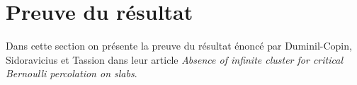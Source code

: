 \chapter{Preuve du résultat}
	Dans cette section on présente la preuve du résultat énoncé par Duminil-Copin, Sidoravicius et Tassion dans leur article \emph{Absence of infinite cluster for critical Bernoulli percolation on slabs}.
	
	
	
	
	
	

\Tbreak
